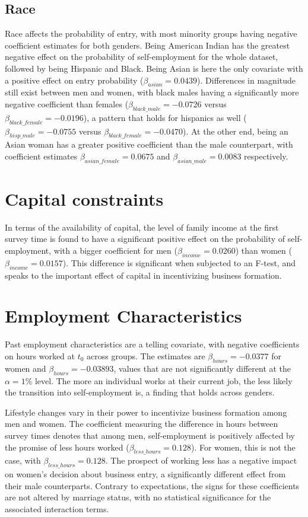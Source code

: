 \subsection{Race}

Race affects the probability of entry, with most minority groups having negative coefficient estimates for both genders. Being American Indian has the greatest negative effect on the probability of self-employment for the whole dataset, followed by being Hispanic and Black. Being Asian is here the only covariate with a positive effect on entry probability ($\beta_{asian} = 0.0439$). Differences in magnitude still exist between men and women, with black males having a significantly more negative coefficient than females ($\beta_{black\_male} = -0.0726$ versus $\beta_{black\_female} = -0.0196$), a pattern that holds for hispanics as well ($\beta_{hisp\_male} = -0.0755$ versus $\beta_{black\_female} = -0.0470$). At the other end, being an Asian woman has a greater positive coefficient than the male counterpart, with coefficient estimates $\beta_{asian\_female} = 0.0675$ and $\beta_{asian\_male} = 0.0083$ respectively. 

\section{Capital constraints}

In terms of the availability of capital, the level of family income at the first survey time is found to have a significant positive effect on the probability of self-employment, with a bigger coefficient for men ($\beta_{income} = 0.0260$) than women ($\beta_{income} = 0.0157$). This difference is significant when subjected to an F-test, and speaks to the important effect of capital in incentivizing business formation.

\section{Employment Characteristics}

Past employment characteristics are a telling covariate, with negative coefficients on hours worked at $t_0$ across groups. The estimates are $\beta_{hours} = -0.0377$ for women and $\beta_{hours} = -0.03893$, values that are not significantly different at the $\alpha = 1 \%$ level. The more an individual works at their current job, the less likely the transition into self-employment is, a finding that holds across genders.

Lifestyle changes vary in their power to incentivize business formation among men and women. The coefficient measuring the difference in hours between survey times denotes that among men, self-employment is positively affected by the promise of less hours worked ($\beta_{less\_hours} = 0.128$). For women, this is not the case, with $\beta_{less\_hours} = 0.128$. The prospect of working less has a negative impact on women’s decision about business entry, a significantly different effect from their male counterparts. Contrary to expectations, the signs for these coefficients are not altered by marriage status, with no statistical significance for the associated interaction terms. 

